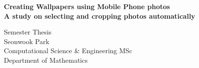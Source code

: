%

\begin{titlepage}

\thispagestyle{empty}




\vspace*{2cm}
\begin{center}
\Huge{\textbf{Creating Wallpapers using Mobile Phone photos}\\}
\LARGE{\textbf{A study on selecting and cropping photos automatically}\\[1cm]}

\large{Semester Thesis\\[0.8cm]}
\LARGE{Seonwook Park\\}
\vspace{.2cm}
\small{Computational Science \& Engineering MSc \\ Department of Mathematics}
\end{center}

\begin{center}



\end{center}



\end{titlepage}
